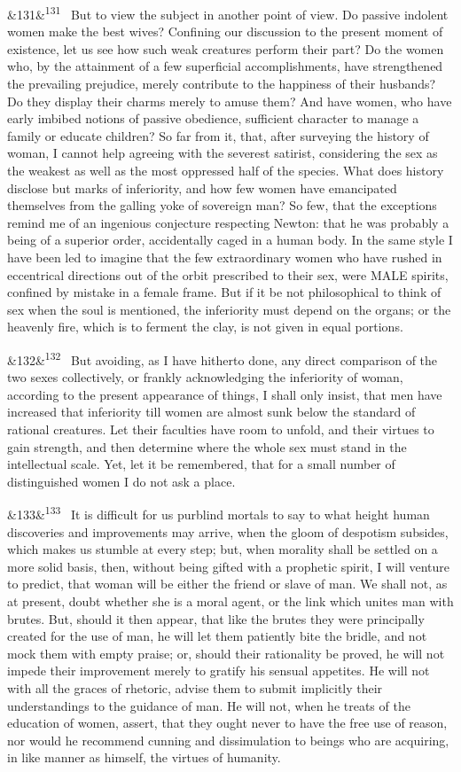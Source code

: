 \documentclass[12pt]{article}
\newcommand{\para}[1][]{\par\noindent\ifx&#1&\else\textsuperscript{\footnotesize #1}~\fi}
\begin{document}
\para[131] But to view the subject in another point of view. Do passive indolent women make the best wives? Confining our discussion to the present moment of existence, let us see how such weak creatures perform their part? Do the women who, by the attainment of a few superficial accomplishments, have strengthened the prevailing prejudice, merely contribute to the happiness of their husbands? Do they display their charms merely to amuse them? And have women, who have early imbibed notions of passive obedience, sufficient character to manage a family or educate children? So far from it, that, after surveying the history of woman, I cannot help agreeing with the severest satirist, considering the sex as the weakest as well as the most oppressed half of the species. What does history disclose but marks of inferiority, and how few women have emancipated themselves from the galling yoke of sovereign man? So few, that the exceptions remind me of an ingenious conjecture respecting Newton: that he was probably a being of a superior order, accidentally caged in a human body. In the same style I have been led to imagine that the few extraordinary women who have rushed in eccentrical directions out of the orbit prescribed to their sex, were MALE spirits, confined by mistake in a female frame. But if it be not philosophical to think of sex when the soul is mentioned, the inferiority must depend on the organs; or the heavenly fire, which is to ferment the clay, is not given in equal portions.

\para[132] But avoiding, as I have hitherto done, any direct comparison of the two sexes collectively, or frankly acknowledging the inferiority of woman, according to the present appearance of things, I shall only insist, that men have increased that inferiority till women are almost sunk below the standard of rational creatures. Let their faculties have room to unfold, and their virtues to gain strength, and then determine where the whole sex must stand in the intellectual scale. Yet, let it be remembered, that for a small number of distinguished women I do not ask a place.

\para[133] It is difficult for us purblind mortals to say to what height human discoveries and improvements may arrive, when the gloom of despotism subsides, which makes us stumble at every step; but, when morality shall be settled on a more solid basis, then, without being gifted with a prophetic spirit, I will venture to predict, that woman will be either the friend or slave of man. We shall not, as at present, doubt whether she is a moral agent, or the link which unites man with brutes. But, should it then appear, that like the brutes they were principally created for the use of man, he will let them patiently bite the bridle, and not mock them with empty praise; or, should their rationality be proved, he will not impede their improvement merely to gratify his sensual appetites. He will not with all the graces of rhetoric, advise them to submit implicitly their understandings to the guidance of man. He will not, when he treats of the education of women, assert, that they ought never to have the free use of reason, nor would he recommend cunning and dissimulation to beings who are acquiring, in like manner as himself, the virtues of humanity.
\end{document}
